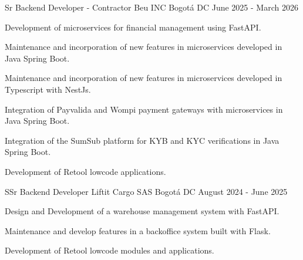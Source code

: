 

\begin{cventries}

  \cventry
    {Sr Backend Developer - Contractor} %
    {Beu INC} %
    {Bogotá DC} %
    {June 2025 - March 2026} %
    {
      \begin{cvitems} %
        \item {Development of microservices for financial management using FastAPI.}
        \item {Maintenance and incorporation of new features in microservices developed in Java Spring Boot.}
        \item {Maintenance and incorporation of new features in microservices developed in Typescript with NestJs.}
        \item {Integration of Payvalida and Wompi payment gateways with microservices in Java Spring Boot.}
        \item {Integration of the SumSub platform for KYB and KYC verifications in Java Spring Boot.}
        \item {Development of Retool lowcode applications.}
      \end{cvitems}
    }


  \cventry
    {SSr Backend Developer} %
    {Liftit Cargo SAS} %
    {Bogotá DC} %
    {August 2024 - June 2025} %
    {
      \begin{cvitems} %
        \item {Design and Development of a warehouse management system with FastAPI.}
        \item {Maintenance and develop features in a backoffice system built with Flask.}
        \item {Development of Retool lowcode modules and applications.}
      \end{cvitems}
    }
  

\end{cventries}
